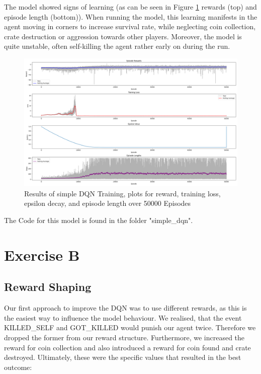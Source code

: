 \documentclass{article} %
\begin{document}
	 The model showed signs of learning (as can be seen in Figure \ref{fig:1} rewards (top) and episode length (bottom)). When running the model, this learning manifests in the agent moving in corners to increase survival rate, while neglecting coin collection, crate destruction or aggression towards other players. Moreover, the model is quite unstable, often self-killing the agent rather early on during the run. 
	
	\begin{figure}[h!]
		\centering
		\includegraphics[width=1.0\textwidth]{images/first_training_results}
		\caption{Results of simple DQN Training, plots for reward, training loss, epsilon decay, and episode length over 50000 Episodes}
		\label{fig:1}
	\end{figure}
	
	
	The Code for this model is found in the folder "simple\_dqn".
	\newpage
	
	\section{Exercise B}
	\subsection{Reward Shaping}
	Our first approach to improve the DQN was to use different rewards, as this is the easiest way to influence the model behaviour. We realised, that the event KILLED\_SELF and GOT\_KILLED would punish our agent twice. Therefore we dropped the former from our reward structure. Furthermore, we increased the reward for coin collection and also introduced a reward for coin found and crate destroyed. Ultimately, these were the specific values that resulted in the best outcome:\newline
	
\end{document}
